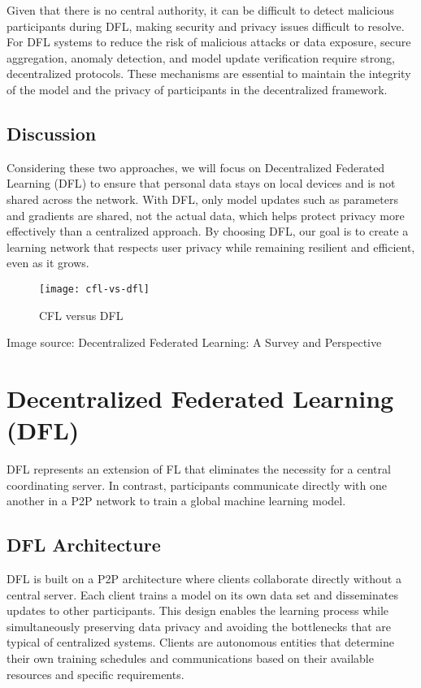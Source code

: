 Given that there is no central authority, it can be difficult to detect malicious participants during \gls{DFL}, making security and privacy issues difficult to resolve. For \gls{DFL} systems to reduce the risk of malicious attacks or data exposure, secure aggregation, anomaly detection, and model update verification require strong, decentralized protocols. These mechanisms are essential to maintain the integrity of the model and the privacy of participants in the decentralized framework. 


\subsection{Discussion}
\label{sub:discussion_fl}

Considering these two approaches, we will focus on Decentralized Federated Learning (\gls{DFL}) to ensure that personal data stays on local devices and is not shared across the network. With \gls{DFL}, only model updates such as parameters and gradients are shared, not the actual data, which helps protect privacy more effectively than a centralized approach.
By choosing \gls{DFL}, our goal is to create a learning network that respects user privacy while remaining resilient and efficient, even as it grows.

\begin{figure}[htbp]
  \centering
  \texttt{[image: cfl-vs-dfl]}
  \caption{CFL versus DFL}
  \label{fig:dfl_vs_cfl}
\end{figure}

Image source: Decentralized Federated Learning: A Survey and Perspective

\section{Decentralized Federated Learning (DFL)}
\label{sub:decentralized_federated_learning_2}

\gls{DFL} represents an extension of \gls{FL} that eliminates the necessity for a central coordinating server. In contrast, participants communicate directly with one another in a \gls{P2P} network to train a global machine learning model. 

\subsection{DFL Architecture}
\label{sub:dfl_architecture}

\gls{DFL} is built on a \gls{P2P} architecture where clients collaborate directly without a central server.  Each client trains a model on its own data set and disseminates updates to other participants. This design enables the learning process while simultaneously preserving data privacy and avoiding the bottlenecks that are typical of centralized systems. Clients are autonomous entities that determine their own training schedules and communications based on their available resources and specific requirements.

